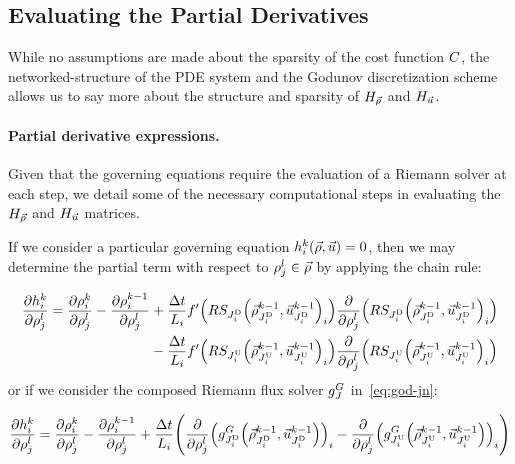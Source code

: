 \subsection{Evaluating the Partial Derivatives\label{sub:Evaluating--and}}

While no assumptions are made about the sparsity of the cost function
$C$, the networked-structure of the PDE system and the Godunov
discretization scheme allows us to say more about the structure and
sparsity of $H_{\vec{\rho}}$ and $H_{\vec{u}}$.


\paragraph{Partial derivative expressions.}

Given that the governing equations require the evaluation of a Riemann
solver at each step, we detail some of the necessary computational
steps in evaluating the $H_{\vec{\rho}}$ and $H_{\vec{u}}$ matrices. 

If we consider a particular governing equation $\syseq_{\link}^{\tind}\left(\state,\control\right)=0$,
then we may determine the partial term with respect to $\rho_{j}^{l}\in\vec{\rho}$
by applying the chain rule:

\begin{align}
\pfrac{\syseq_{\link}^{\tind}}{\discrete jl}=\pfrac{\discrete{\link}{\tind}}{\discrete jl}-\pfrac{\discrete{\link}{\tind-1}}{\discrete jl} & +\frac{\Delta t}{L_{i}}f'\left(\RS_{\jdown{\link}}\left(\juncstate{\jdown{\link}}{\tind-1},\junccon{\jdown{\link}}{\tind-1}\right)_{\link}\right)\pfrac{}{\discrete jl}\left(\RS_{\jdown{\link}}\left(\juncstate{\jdown{\link}}{\tind-1},\junccon{\jdown{\link}}{\tind-1}\right)_{\link}\right)\label{eq:dhdufull} \\
& -\frac{\Delta t}{L_{i}}f'\left(\RS_{\jup{\link}}\left(\juncstate{\jup{\link}}{\tind-1},\junccon{\jup{\link}}{\tind-1}\right)_{\link}\right)\pfrac{}{\discrete jl}\left(\RS_{\jup{\link}}\left(\juncstate{\jup{\link}}{\tind-1},\junccon{\jup{\link}}{\tind-1}\right)_{\link}\right)\nonumber                       
\end{align}				
or if we consider the composed Riemann flux solver $g^{G}_{J}$ in~\eqref{eq:god-jn}:

\begin{equation}
\pfrac{\syseq_{\link}^{\tind}}{\discrete jl}=\pfrac{\discrete{\link}{\tind}}{\discrete jl}-\pfrac{\discrete{\link}{\tind-1}}{\discrete jl}+\frac{\Delta t}{L_{i}}\left(\pfrac{}{\discrete jl}\left(\god_{\jdown{\link}}\left(\juncstate{\jdown{\link}}{\tind-1},\junccon{\jdown{\link}}{\tind-1}\right)\right)_{\link}-\pfrac{}{\discrete jl}\left(\god_{\jup{\link}}\left(\juncstate{\jup{\link}}{\tind-1},\junccon{\jup{\link}}{\tind-1}\right)\right)_{\link}\right)\label{eq:dhdugod}
\end{equation}


